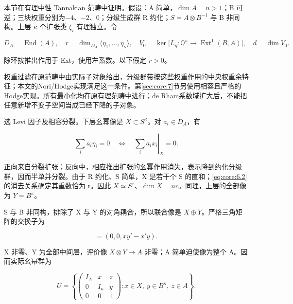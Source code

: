 \documentclass[11pt,a4paper,oneside]{ctexart}
\theoremstyle{cnplain}
\theoremstyle{definition}
\theoremstyle{remark}
\numberwithin{equation}{section}
\begin{document}
本节在有理中性 Tannakian 范畴中证明。假设：A 简单，\(\dim A=n>1\)；B 可逆；三块权重分别为\(- 4\)、\(- 2\)、0；分级生成群 R 约化；\(S=A\otimes B^{-1}\) 与 B 非同构。上层 \(\kappa \) 个扩张类 \(\xi _i\) 有理独立。令

\begin{equation}
D_A=\operatorname{End}(A),\quad
 r=\dim_{D_A}\langle\eta_1,\ldots,\eta_\kappa\rangle,
 \quad V_0=\ker\bigl[L_\eta:\mathbb Q^\kappa\to
             \operatorname{Ext}^1(B,A)\bigr],\quad d=\dim V_0.  \label{eq:core:6.1}
\end{equation}

除环按推出作用于 Ext，使用左系数。以下假定 \(r>0\)。

权重过滤在原范畴中由实际子对象给出，分级群带按这些权重作用的中央权重余特征；本文的Nori/Hodge实现满足这一条件。第\ref{sec:core:7}节另使用相容且严格的Hodge实现。所有最小化均在原有理范畴中进行；de Rham系数域扩大后，不能把任意新增不变子空间当成已经下降的子对象。

选 Levi 因子及相容分裂。下层幺幂像是 \(X\subset S^\kappa\)。对 \(a_i\in D_A\)，有

\begin{equation}
\sum_i a_i\eta_i=0
        \quad\Longleftrightarrow\quad
       \left.\sum_i a_ix_i\right|_X=0.                   \label{eq:core:6.2}
\end{equation}

正向来自分裂扩张；反向中，相应推出扩张的幺幂作用消失，表示降到约化分级群，因而半单并分裂。由于 R 约化、S 简单，X 是若干个 S 的直和；\eqref{eq:core:6.2}的消去关系确定其重数恰为 r。因此 \(X\simeq S^r\)、\(\dim X=nr\)。同理，上层的全部像为 \(Y=B^\kappa\)。

S 与 B 非同构，排除了 X 与 Y 的对角耦合，所以联合像是 \(X\oplus Y\)。严格三角矩阵的交换子为

\begin{equation}
[(x,y,z),(x',y',z')]=(0,0,xy'-x'y).                     \label{eq:core:6.3}
\end{equation}

X 非零、Y 为全部中间层，评价像 \(X\otimes Y\to A\) 非零；A 简单迫使像为整个 A。因而实际幺幂群为

\begin{equation}
U=\left\{\begin{pmatrix}I_A&x&z\\0&I_\kappa&y\\0&0&1\end{pmatrix}
           :x\in X,\ y\in B^\kappa,\ z\in A\right\}.    \label{eq:core:6.4}
\end{equation}
\end{document}
